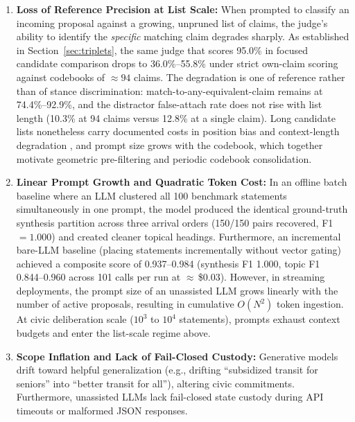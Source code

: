 \documentclass{article}
\begin{document}
\begin{enumerate}
\item \textbf{Loss of Reference Precision at List Scale:} When prompted to classify an incoming proposal against a growing, unpruned list of claims, the judge's ability to identify the \emph{specific} matching claim degrades sharply. As established in Section~\ref{sec:triplets}, the same judge that scores 95.0\% in focused candidate comparison drops to 36.0\%--55.8\% under strict own-claim scoring against codebooks of $\approx 94$ claims. The degradation is one of reference rather than of stance discrimination: match-to-any-equivalent-claim remains at 74.4\%--92.9\%, and the distractor false-attach rate does not rise with list length (10.3\% at 94 claims versus 12.8\% at a single claim). Long candidate lists nonetheless carry documented costs in position bias and context-length degradation \citep{liu2024lost}, and prompt size grows with the codebook, which together motivate geometric pre-filtering and periodic codebook consolidation.

\item \textbf{Linear Prompt Growth and Quadratic Token Cost:} In an offline batch baseline where an LLM clustered all 100 benchmark statements simultaneously in one prompt, the model produced the identical ground-truth synthesis partition across three arrival orders (150/150 pairs recovered, F1 $=1.000$) and created cleaner topical headings. Furthermore, an incremental bare-LLM baseline (placing statements incrementally without vector gating) achieved a composite score of 0.937--0.984 (synthesis F1 1.000, topic F1 0.844--0.960 across 101 calls per run at $\approx$\,\$0.03). However, in streaming deployments, the prompt size of an unassisted LLM grows linearly with the number of active proposals, resulting in cumulative $O(N^2)$ token ingestion. At civic deliberation scale ($10^3$ to $10^4$ statements), prompts exhaust context budgets and enter the list-scale regime above.

\item \textbf{Scope Inflation and Lack of Fail-Closed Custody:} Generative models drift toward helpful generalization (e.g., drifting ``subsidized transit for seniors'' into ``better transit for all''), altering civic commitments. Furthermore, unassisted LLMs lack fail-closed state custody during API timeouts or malformed JSON responses.
\end{enumerate}
\end{document}
